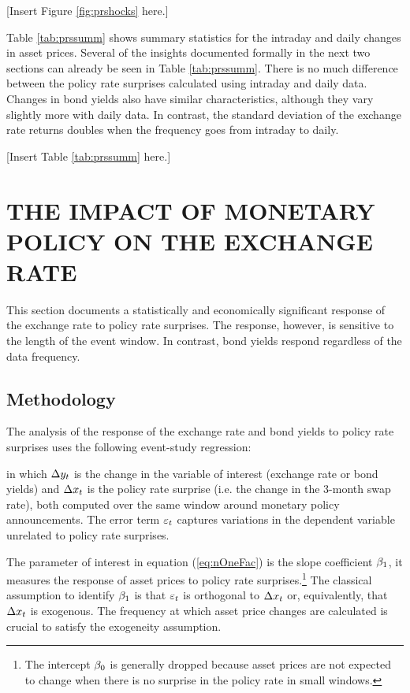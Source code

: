 %
\begin{center}
	[Insert Figure \ref{fig:prshocks} here.]
\end{center}

Table \ref{tab:prssumm} shows summary statistics for the intraday and daily changes in asset prices. 
Several of the insights documented formally in the next two sections can already be seen in Table \ref{tab:prssumm}. There is no much difference between the policy rate surprises calculated using intraday and daily data. Changes in bond yields also have similar characteristics, although they vary slightly more with daily data. In contrast, the standard deviation of the exchange rate returns doubles when the frequency goes from intraday to daily.

%
\begin{center}
	[Insert Table \ref{tab:prssumm} here.]
\end{center}

\sectitlespace
\section{THE IMPACT OF MONETARY POLICY ON THE EXCHANGE RATE} \label{sec:policyrate}
\sectitlespace

This section documents a statistically and economically significant response of the exchange rate to policy rate surprises. The response, however, is sensitive to the length of the event window. In contrast, bond yields respond regardless of the data frequency. 

\sectitlespace
\subsection{Methodology}
\sectitlespace
The analysis of the response of the exchange rate and bond yields to policy rate surprises uses the following event-study regression:
	
\noindent in which \(\Delta y_{t}\) is the change in the variable of interest (exchange rate or bond yields) and \(\Delta x_{t}\) is the policy rate surprise (i.e. the change in the 3-month swap rate), both computed over the same window around monetary policy announcements. The error term \(\varepsilon_{t}\) captures variations in the dependent variable unrelated to policy rate surprises.

The parameter of interest in equation (\ref{eq:nOneFac}) is the slope coefficient \(\beta_{1}\), it measures the response of asset prices to policy rate surprises.\footnote{The intercept \(\beta_{0}\) is generally dropped because asset prices are not expected to change when there is no surprise in the policy rate in small windows.} The classical assumption to identify \(\beta_{1}\) is that \(\varepsilon_{t}\) is orthogonal to \(\Delta x_{t}\) or, equivalently, that \(\Delta x_{t}\) is exogenous. The frequency at which asset price changes are calculated is crucial to satisfy the exogeneity assumption. 

